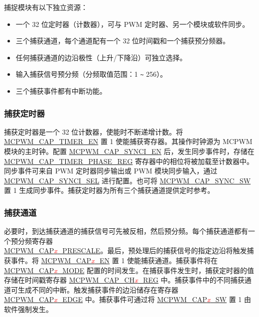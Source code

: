 \documentclass[main\_\_CN.tex]{subfiles}
\begin{document}
捕捉模块有以下独立资源：
\begin{itemize}
    \item  一个 32 位定时器（计数器），可与 PWM 定时器、另一个模块或软件同步。
    \item 三个捕获通道，每个通道配有一个 32 位时间戳和一个捕获预分频器。
    \item 任何捕获通道的边沿极性（上升/下降沿）可独立选择。
    \item 输入捕获信号预分频（分频取值范围：1 \verb+~+ 256）。
    \item 三个捕获事件都有中断功能。
\end{itemize}

\subsubsection{捕获定时器}
 捕获定时器是一个 32 位计数器，使能时不断递增计数。将 \hyperref[fielddesc:MCPWMCAPTIMEREN]{MCPWM\_CAP\_TIMER\_EN} 置 1 使能捕获寄存器。其操作时钟源为 MCPWM模块的主时钟。配置 \hyperref[fielddesc:MCPWMCAPSYNCIEN]{MCPWM\_CAP\_SYNCI\_EN} 后，发生同步事件时，存储在\\ \hyperref[regdesc:MCPWMCAPTIMERPHASEREG]{MCPWM\_CAP\_TIMER\_PHASE\_REG} 寄存器中的相位将被加载至计数器中。同步事件可来自 PWM 定时器同步输出或 PWM 模块同步输入，通过 \hyperref[fielddesc:MCPWMCAPSYNCISEL]{MCPWM\_CAP\_SYNCI\_SEL} 进行配置。也可将 \hyperref[fielddesc:MCPWMCAPSYNCSW]{MCPWM\_CAP\_SYNC\_SW} 置 1 生成同步事件。捕获定时器为所有三个捕获通道提供定时参考。

\subsubsection{捕获通道}

必要时，到达捕获通道的捕获信号可先被反相，然后预分频。每个捕获通道都有一个预分频寄存器 \\\hyperref[fielddesc:MCPWMCAP0PRESCALE]{MCPWM\_CAP\textcolor{red}{\it{x}}\_PRESCALE}。最后，预处理后的捕获信号的指定边沿将触发捕获事件。将 \hyperref[fielddesc:MCPWMCAP0EN]{MCPWM\_CAP\textcolor{red}{\it{x}}\_EN} 置 1 使能捕获通道。捕获事件将在 \hyperref[fielddesc:MCPWMCAP0MODE]{MCPWM\_CAP\textcolor{red}{\it{x}}\_MODE} 配置的时间发生。在捕获事件发生时，捕获定时器的值存储在时间戳寄存器 \hyperref[regdesc:MCPWMCAPCH0REG]{MCPWM\_CAP\_CH\textcolor{red}{\it{x}}\_REG} 中。捕获事件中的不同捕获通道可生成不同的中断。触发捕获事件的边沿储存在寄存器 \hyperref[fielddesc:MCPWMCAP0EDGE]{MCPWM\_CAP\textcolor{red}{\it{x}}\_EDGE} 中。捕获事件可通过将 \hyperref[fielddesc:MCPWMCAP0SW]{MCPWM\_CAP\textcolor{red}{\it{x}}\_SW} 置 1 由软件强制发生。
\end{document}
